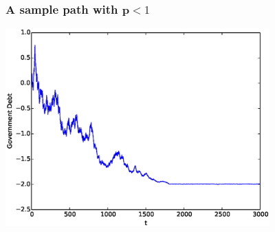 \documentclass{beamer}
\begin{document}
\begin{frame}
	\frametitle{A sample path with   $\bm{p} <1$}
	\begin{center}
	\includegraphics[width=4in]{Images/port2.eps}
	\end{center}
\end{frame}
%
%
%
\end{document}
